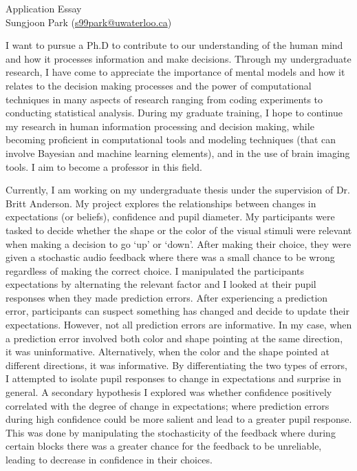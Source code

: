 \documentclass[12pt]{article}
\let\oldcenter\center
\let\oldendcenter\endcenter
\renewenvironment{center}{\setlength\topsep{-1pt}\oldcenter}{\oldendcenter}
\begin{document}
	
	\begin{center}
		{\Large Application Essay} \\
		{\normalsize Sungjoon Park (\href{mailto:s99park@uwaterloo.ca}{s99park@uwaterloo.ca})}
	\end{center}
	
	I want to pursue a Ph.D to contribute to our understanding of the human mind and how it processes information and make decisions. Through my undergraduate research, I have come to appreciate the importance of mental models and how it relates to the decision making processes and the power of computational techniques in many aspects of research ranging from coding experiments to conducting statistical analysis. During my graduate training, I hope to continue my research in human information processing and decision making, while becoming proficient in computational tools and modeling techniques (that can involve Bayesian and machine learning elements), and in the use of brain imaging tools. I aim to become a professor in this field. 
	
	Currently, I am working on my undergraduate thesis under the supervision of Dr. Britt Anderson. My project explores the relationships between changes in expectations (or beliefs), confidence and pupil diameter. My participants were tasked to decide whether the shape or the color of the visual stimuli were relevant when making a decision to go `up' or `down'. After making their choice, they were given a stochastic audio feedback where there was a small chance to be wrong regardless of making the correct choice. I manipulated the participants expectations by alternating the relevant factor and I looked at their pupil responses when they made prediction errors. After experiencing a prediction error, participants can suspect something has changed and decide to update their expectations. However, not all prediction errors are informative. In my case, when a prediction error involved both color and shape pointing at the same direction, it was uninformative. Alternatively, when the color and the shape pointed at different directions, it was informative. By differentiating the two types of errors, I attempted to isolate pupil responses to change in expectations and surprise in general. A secondary hypothesis I explored was whether confidence positively correlated with the degree of change in expectations; where prediction errors during high confidence could be more salient and lead to a greater pupil response. This was done by manipulating the stochasticity of the feedback where during certain blocks there was a greater chance for the feedback to be unreliable, leading to decrease in confidence in their choices.
	
\end{document}
